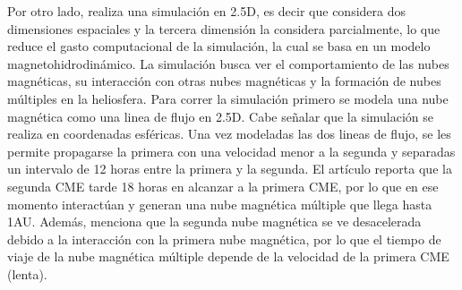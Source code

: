 Por otro lado, \cite{} realiza una simulación en 2.5D, es decir que considera dos dimensiones espaciales y la tercera dimensión la considera parcialmente, lo que reduce el gasto computacional de la simulación, la cual se basa en un modelo magnetohidrodinámico. La simulación busca ver el comportamiento de las nubes magnéticas, su interacción con otras nubes magnéticas y la formación de nubes múltiples en la heliosfera.
Para correr la simulación primero se modela una nube magnética como una linea de flujo en 2.5D. Cabe señalar que la simulación se realiza en coordenadas esféricas. Una vez modeladas las dos lineas de flujo, se les permite propagarse la primera con una velocidad menor a la segunda y separadas un intervalo de 12 horas entre la primera y la segunda.
El artículo reporta que la segunda \ac{CME} tarde 18 horas en alcanzar a la primera CME, por lo que en ese momento interactúan y generan una nube magnética múltiple que llega hasta 1AU. Además, menciona que la segunda nube magnética se ve desacelerada debido a la interacción con la primera nube magnética, por lo que el tiempo de viaje de la nube magnética múltiple depende de la velocidad de la primera \ac{CME} (lenta). 

